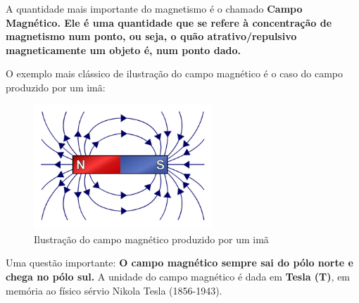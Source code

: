 \documentclass[12pt]{extarticle}
\newcommand{\<}{\langle}
\renewcommand{\>}{\rangle}
\theoremstyle{definition}
\begin{document}
A quantidade mais importante do magnetismo é o chamado \textbf{Campo Magnético. Ele é uma quantidade que se refere à concentração de magnetismo num ponto, ou seja, o quão atrativo/repulsivo magneticamente um objeto é, num ponto dado.}

O exemplo mais clássico de ilustração do campo magnético é o caso do campo produzido por um imã:

\begin{figure}[H]
    \centering
    \includegraphics[width=0.6\textwidth]{main-qimg-410abffadd25e28bd5dfa66f0efb9e65.png}
    \caption{Ilustração do campo magnético produzido por um imã}
    \label{fig:magnetic_field}
\end{figure}

Uma questão importante: \textbf{O campo magnético sempre sai do pólo norte e chega no pólo sul.} A unidade do campo magnético é dada em \textbf{Tesla (T)}, em memória ao físico sérvio Nikola Tesla (1856-1943).
\end{document}
